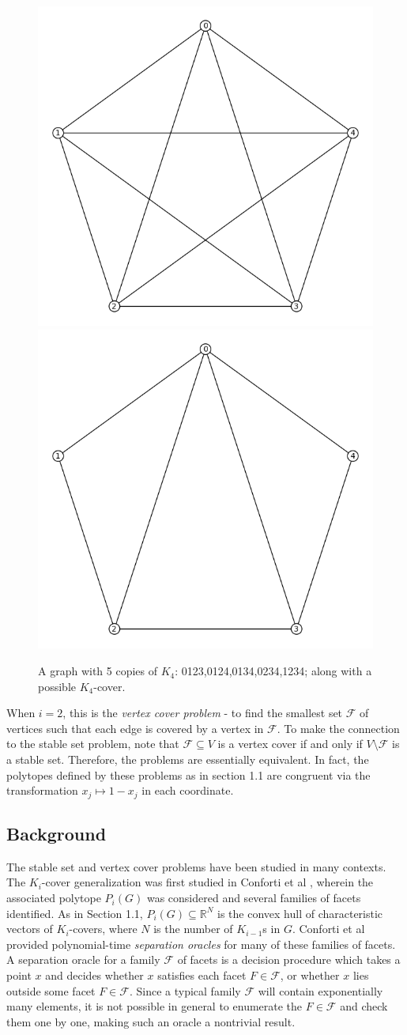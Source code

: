 \begin{figure}[htd]
	\centering
	\includegraphics[width=.4\textwidth,natwidth=613,natheight=584]{K5.png}
	\includegraphics[width=.4\textwidth,natwidth=613,natheight=584]{K4cover.png}
	\caption{A graph with 5 copies of $K_4$: 0123,0124,0134,0234,1234; along with a possible $K_4$-cover.}
	\label{K5}
\end{figure}

When $i=2$, this is the \emph{vertex cover problem} - to find the smallest
set $\mathcal{F}$ of vertices such that each edge is covered by a vertex in
$\mathcal{F}$. To make the
connection to the stable set problem, note that $\mathcal{F} \subseteq V$ is a vertex
cover if and only if $V \setminus \mathcal{F}$ is a stable set.
Therefore, the problems are essentially equivalent. In fact, the polytopes
defined by these problems as in section 1.1 are congruent via the transformation
$x_j \mapsto 1-x_j$ in each coordinate.

\subsection{Background}

The stable set and vertex cover problems have been studied in many contexts. 
The $K_i$-cover generalization was first studied in Conforti et al 
\cite{conforti}, wherein the associated polytope $P_i(G)$ was 
considered and several families of facets identified. 
As in Section 1.1, $P_i(G) \subseteq \mathbb{R}^N$ is the convex hull of
characteristic vectors of $K_i$-covers, where $N$ is the number of $K_{i-1}$s in
$G$. 
Conforti et al provided polynomial-time {\em separation oracles} for many of these families of facets. 
A separation oracle for a family $\mathcal{F}$ of facets is a decision procedure
which takes a point $x$ and decides whether $x$ satisfies each facet $F \in
\mathcal{F}$, or whether $x$ lies outside some facet $F \in \mathcal{F}$.
Since a typical family $\mathcal{F}$ will contain exponentially many elements, it is not possible in general to enumerate the $F \in \mathcal{F}$ and check them one by one, making such an oracle a nontrivial result.

